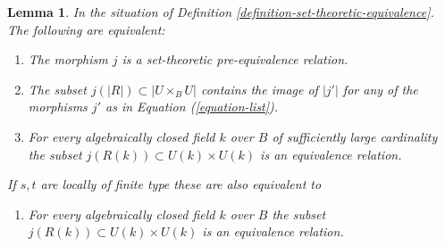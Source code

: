 \documentclass[10pt,a4paper]{amsart}
\theoremstyle{plain}
\newtheorem{lemma}[subsection]{Lemma}
\theoremstyle{definition}
\theoremstyle{remark}
\numberwithin{equation}{subsection}
\begin{document}
\begin{lemma}
\label{lemma-set-theoretic-pre-equivalence-geometric}
In the situation of Definition \ref{definition-set-theoretic-equivalence}.
The following are equivalent:
\begin{enumerate}
\item The morphism $j$ is a set-theoretic pre-equivalence relation.
\item The subset $j(|R|) \subset |U \times_B U|$ contains the image of
$|j'|$ for any of the morphisms $j'$ as in Equation (\ref{equation-list}).
\item For every algebraically closed field $k$ over $B$ of sufficiently large
cardinality the subset $j(R(k)) \subset U(k) \times U(k)$ is an equivalence
relation.
\end{enumerate}
If $s, t$ are locally of finite type these are also equivalent to
\begin{enumerate}
\item[(4)] For every algebraically closed field $k$ over $B$
the subset $j(R(k)) \subset U(k) \times U(k)$ is an equivalence relation.
\end{enumerate}
\end{lemma}
\end{document}
